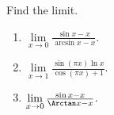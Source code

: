 Find the limit.
\begin{multicols}{2}
\begin{enumerate}
\item $\displaystyle \lim\limits_{x\to 0} \frac{\sin x-x }{\arcsin x-x } $.
\item \label{problemLHospital (sin (pi x) ln x )/ (cos pi x +1)}  $\displaystyle \lim\limits_{x\to 1} \frac{\sin \left(\pi x\right)\ln x }{\cos(\pi x)+1 } $.
\item \label{problemlim x to 0 (sin x - x)/(arctan x - x)} $\lim\limits_{x\to 0}\frac{\sin x- x}{\Arctan x -x}$.

\end{enumerate}
\end{multicols}
